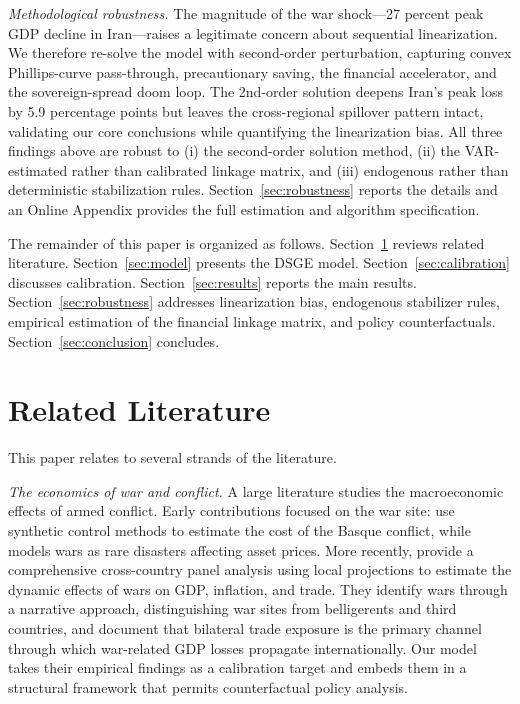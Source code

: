 \documentclass[12pt,a4paper]{article}
\begin{document}
\textit{Methodological robustness.} The magnitude of the war shock---27 percent peak GDP decline in Iran---raises a legitimate concern about sequential linearization. We therefore re-solve the model with second-order perturbation, capturing convex Phillips-curve pass-through, precautionary saving, the financial accelerator, and the sovereign-spread doom loop. The 2nd-order solution deepens Iran's peak loss by 5.9 percentage points but leaves the cross-regional spillover pattern intact, validating our core conclusions while quantifying the linearization bias. All three findings above are robust to (i) the second-order solution method, (ii) the VAR-estimated rather than calibrated linkage matrix, and (iii) endogenous rather than deterministic stabilization rules. Section~\ref{sec:robustness} reports the details and an Online Appendix provides the full estimation and algorithm specification.

The remainder of this paper is organized as follows. Section~\ref{sec:literature} reviews related literature. Section~\ref{sec:model} presents the DSGE model. Section~\ref{sec:calibration} discusses calibration. Section~\ref{sec:results} reports the main results. Section~\ref{sec:robustness} addresses linearization bias, endogenous stabilizer rules, empirical estimation of the financial linkage matrix, and policy counterfactuals. Section~\ref{sec:conclusion} concludes.



\section{Related Literature}
\label{sec:literature}

This paper relates to several strands of the literature.

\textit{The economics of war and conflict.} A large literature studies the macroeconomic effects of armed conflict. Early contributions focused on the war site: \citet{abadie2003economic} use synthetic control methods to estimate the cost of the Basque conflict, while \citet{barro2006rare} models wars as rare disasters affecting asset prices. More recently, \citet{federle2026price} provide a comprehensive cross-country panel analysis using local projections \citep{jorda2005estimation} to estimate the dynamic effects of wars on GDP, inflation, and trade. They identify wars through a narrative approach, distinguishing war sites from belligerents and third countries, and document that bilateral trade exposure is the primary channel through which war-related GDP losses propagate internationally. Our model takes their empirical findings as a calibration target and embeds them in a structural framework that permits counterfactual policy analysis.
\end{document}
